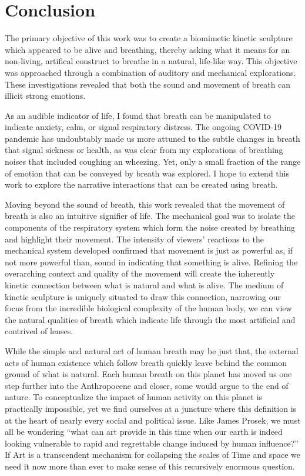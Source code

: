 \documentclass[letterpaper]{article}
\begin{document}
\section{Conclusion}


The primary objective of this work was to create a biomimetic kinetic sculpture which appeared to be alive and breathing, thereby asking what it means for an non-living, artifical construct to breathe in a natural, life-like way. This objective was approached through a combination of auditory and mechanical explorations. These investigations revealed that both the sound and movement of breath can illicit strong emotions. 

As an audible indicator of life, I found that breath can be manipulated to indicate anxiety, calm, or signal respiratory distress. The ongoing COVID-19 pandemic has undoubtably made us more attuned to the subtle changes in breath that signal sickness or health, as was clear from my explorations of breathing noises that included coughing an wheezing. Yet, only a small fraction of the range of emotion that can be conveyed by breath was explored. I hope to extend this work to explore the narrative interactions that can be created using breath.

Moving beyond the sound of breath, this work revealed that the movement of breath is also an intuitive signifier of life. The mechanical goal was to isolate the components of the respiratory system which form the noise created by breathing and highlight their movement. The intensity of viewers' reactions to the mechanical system developed confirmed that movement is just as powerful as, if not more powerful than, sound in indicating that something is alive. Refining the overarching context and quality of the movement will create the inherently kinetic connection between what is natural and what is alive. The medium of kinetic sculpture is uniquely situated to draw this connection, narrowing our focus from the incredible biological complexity of the human body, we can view the natural qualities of breath which indicate life through the most artificial and contrived of lenses.  

While the simple and natural act of human breath may be just that, the external acts of human existence which follow breath quickly leave behind the common ground of what is natural. Each human breath on this planet has moved us one step further into the Anthropocene and closer, some would argue to the end of nature.\cite{smith} To conceptualize the impact of human activity on this planet is practically impossible, yet we find ourselves at a juncture where this definition is at the heart of nearly every social and political issue. Like James Prosek, we must all be wondering ``what can art provide in this time when our earth is indeed looking vulnerable to rapid and regrettable change induced by human influence?''\cite{prosek} If Art is a transcendent mechanism for collapsing the scales of Time and space we need it now more than ever to make sense of this recursively enormous question.
\end{document}
